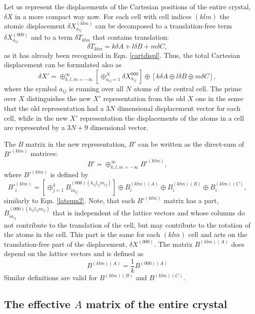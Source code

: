 \documentclass[prl,aps,preprint,superbib,12pt]{revtex4}
\begin{document}
Let us represent the displacements of the Cartesian
positions of the entire crystal, $\delta X$ in a more
compact way now. For each cell with cell indices
$(klm)$ the atomic displacement $\delta X^{(klm)}_{a_{ij}}$
can be decomposed to a translation-free term 
$\delta X^{(000)}_{a_{ij}}$ and to a term $\delta T_{klm}$ that
contains translation:
\begin{equation}
\delta T_{klm} = k \delta A + l \delta B + m \delta C ,
\end{equation}
as it has already been recognized in Eqn. \ref{cartdispl}.
Thus, the total Cartesian displacement can be formulated also as
\begin{equation} \label{newx}
\delta X' = 
\oplus_{k,l,m=-\infty}^{\infty}
\left[ \oplus_{a_{ij}=1}^{N} \delta X^{000}_{a_{ij}} \right]
\oplus
\left[ 
 k \delta A \oplus l \delta B \oplus m \delta C \right] ,
\end{equation}
where the symbol $a_{ij}$ is running over all $N$ atoms
of the central cell. The prime over $X$ distinguishes
the new $X'$ representation from the old $X$ one in the sense
that the old representation had a $3N$ dimensional displacement
vector for each cell, while in the new $X'$ representation
the displacements of the atoms in a cell are represented by
a $3N+9$ dimensional vector.

The $B$ matrix in the new representation, $B'$ can be written
as the direct-sum of $B'^{(klm)}$ matrices:
\begin{equation}
B' = \oplus_{k,l,m=-\infty}^{\infty} B'^{(klm)} ,
\end{equation}
where $B'^{(klm)}$ is defined by 
\begin{equation} \label{latsum4}
B'^{(klm)}_{i} =
[\oplus_{j=1}^{4}
B^{(000)(k_{ij}l_{ij}m_{ij})}_{ia_{ij}}
] \oplus B^{(klm)(A)}_{i} \oplus B^{(klm)(B)}_{i} 
\oplus B^{(klm)(C)}_{i} ,
\end{equation}
similarly to Eqn. \ref{latsum2}. Note, that each
$B'^{(klm)}$ matrix has a part, 
$B^{(000)(k_{ij}l_{ij}m_{ij})}_{ia_{ij}}$
that is independent of the lattice vectors and whose
columns do not contribute to the translation 
of the cell, but may contribute to the rotation of the
atoms in the cell. This part is the same for each $(klm)$ cell
and acts on the translation-free part of the displacement,
$\delta X^{(000)}$. The matrix $B^{(klm)(A)}$ 
does depend on the lattice vectors and is defined as
\begin{equation} \label{matba}
B^{(klm)(A)} = \frac{1}{k} B^{(000)(A)}
\end{equation}
Similar definitions are valid for $B^{(klm)(B)}$ and
$B^{(klm)(C)}$.

\subsection{The effective $A$ matrix of the entire crystal}



\end{document}
